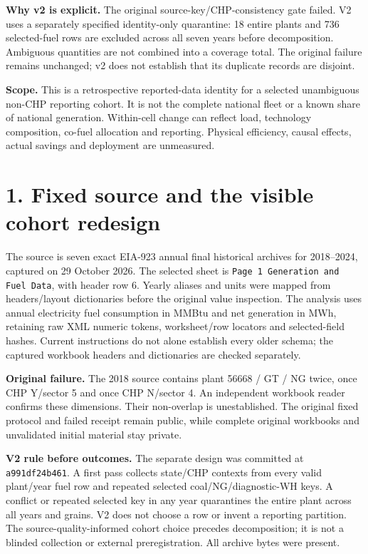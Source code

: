 \documentclass[11pt]{article}
\newcommand{\QuarantinedPlants}{18}
\newcommand{\QuarantinedRows}{736}
\begin{document}
\textbf{Why v2 is explicit.} The original source-key/CHP-consistency gate failed. V2 uses a separately specified identity-only quarantine: \QuarantinedPlants{} entire plants and \QuarantinedRows{} selected-fuel rows are excluded across all seven years before decomposition. Ambiguous quantities are not combined into a coverage total. The original failure remains unchanged; v2 does not establish that its duplicate records are disjoint.

\textbf{Scope.} This is a retrospective reported-data identity for a selected unambiguous non-CHP reporting cohort. It is not the complete national fleet or a known share of national generation. Within-cell change can reflect load, technology composition, co-fuel allocation and reporting. Physical efficiency, causal effects, actual savings and deployment are unmeasured.

\clearpage
\section*{1. Fixed source and the visible cohort redesign}
The source is seven exact EIA-923 annual final historical archives for 2018--2024, captured on 29 October 2026. The selected sheet is \texttt{Page 1 Generation and Fuel Data}, with header row 6. Yearly aliases and units were mapped from headers/layout dictionaries before the original value inspection. The analysis uses annual electricity fuel consumption in MMBtu and net generation in MWh, retaining raw XML numeric tokens, worksheet/row locators and selected-field hashes. Current instructions do not alone establish every older schema; the captured workbook headers and dictionaries are checked separately.

\textbf{Original failure.} The 2018 source contains plant 56668 / GT / NG twice, once CHP Y/sector 5 and once CHP N/sector 4. An independent workbook reader confirms these dimensions. Their non-overlap is unestablished. The original fixed protocol and failed receipt remain public, while complete original workbooks and unvalidated initial material stay private.

\textbf{V2 rule before outcomes.} The separate design was committed at \texttt{a991df24b461}. A first pass collects state/CHP contexts from every valid plant/year fuel row and repeated selected coal/NG/diagnostic-WH keys. A conflict or repeated selected key in any year quarantines the entire plant across all years and grains. V2 does not choose a row or invent a reporting partition. The source-quality-informed cohort choice precedes decomposition; it is not a blinded collection or external preregistration. All archive bytes were present.
\end{document}
